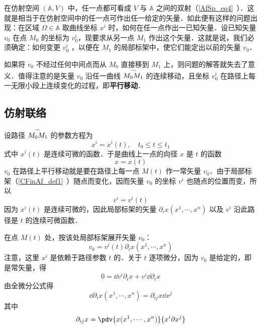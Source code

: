 
在仿射空间 $(\mathbb A,V)$ 中，任一点都可看成 $V$ 与 $\mathbb A$ 之间的双射（\autoref{AfSp_eq4}~）．这就是相当于在仿射空间中的任一点可作出任一给定的矢量．如此便有这样的问题出现：在区域 $\Omega\in\mathbb A$ 取曲线坐标 $x^i$ 时，如何在任一点作出一已知矢量．设已知矢量 $v_0$ 在点 $M_0$ 的坐标为 $v_0^i$，现要求从另一点 $M_1$ 作出这个矢量．这就是说，我们必须确定：如何变更 $v_0^i$ ，以便在 $M_1$ 的局部标架中，使它们能定出以前的矢量 $v_0$．

如果将 $v_0$ 不经过任何中间点而从 $M_0$ 直接移到 $M_1$ 上，则问题的解答就失去了意义．值得注意的是矢量 $v_0$ 沿任一曲线 $\overset{\Huge\frown}{M_0M_1}$ 的连续移动，且坐标 $v_0^i$ 在路径上每一无限小段上连续变化的过程，即\textbf{平行移动}．
\subsection{仿射联络}
设路径 $\overset{\Huge\frown}{M_0M_1}$ 的参数方程为
\begin{equation}
x^i=x^i(t),\quad t_0\leq t\leq t_1
\end{equation}
式中 $x^i(t)$ 是连续可微的函数．于是曲线上一点的向径 $x$ 是 $t$ 的函数
\begin{equation}
x=x(t)
\end{equation}
$v_0$ 在路径上平行移动就是要在路径上每一点 $M(t)$ 作一常矢量 $v_0$．由于局部标架（\autoref{CFinAf_def1}~）随点而变化，因而矢量 $v_0$ 的坐标 $v^i$ 也随点的位置而变，所以
\begin{equation}
v^i=v^i(t)
\end{equation}
因为 $x^i(t)$ 是连续可微的，因此局部标架的矢量 $\partial_i x(x^1,\cdots,x^n)$ 以及 $v^i$ 沿此路径是 $t$ 的连续可微函数．

在点 $M(t)$ 处，按该处局部标架展开矢量 $v_0$：
\begin{equation}
v_0=v^i(t)\partial_i x(x^1,\cdots,x^n)
\end{equation}
注意，这里 $x^i$ 是依赖于路径参数 $t$ 的．关于 $t$ 逐项微分，因为 $v_0$ 是给定的，即是常矢量，得
\begin{equation}
0=\dd v^i\partial_i x+v^i\dd \partial_i x
\end{equation}
由全微分公式得
\begin{equation}
\dd \partial_i x(x^1,\cdots,x^n)=\partial_{ij}x\dd x^j
\end{equation}
其中
\begin{equation}
\partial_{ij}x=\pdv{x(x^1,\cdots,x^n)}{x^i\partial x^j}
\end{equation}

